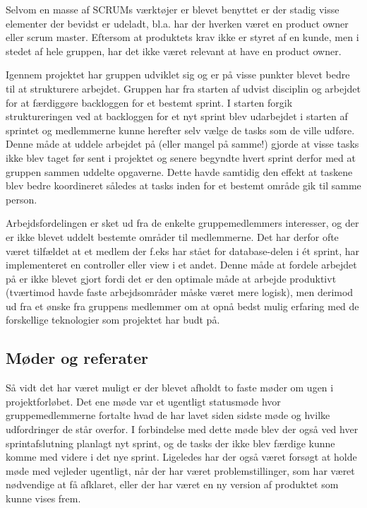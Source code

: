 Selvom en masse af SCRUMs værktøjer er blevet benyttet er der stadig visse elementer der bevidst er udeladt, bl.a. har der hverken været en product owner eller scrum master. Eftersom at produktets krav ikke er styret af en kunde, men i stedet af hele gruppen, har det ikke været relevant at have en product owner.

Igennem projektet har gruppen udviklet sig og er på visse punkter blevet bedre til at strukturere arbejdet. Gruppen har fra starten af udvist disciplin og arbejdet for at færdiggøre backloggen for et bestemt sprint. I starten forgik struktureringen ved at backloggen for et nyt sprint blev udarbejdet i starten af sprintet og medlemmerne kunne herefter selv vælge de tasks som de ville udføre. Denne måde at uddele arbejdet på (eller mangel på samme!) gjorde at visse tasks ikke blev taget før sent i projektet og senere begyndte hvert sprint derfor med at gruppen sammen uddelte opgaverne. Dette havde samtidig den effekt at taskene blev bedre koordineret således at tasks inden for et bestemt område gik til samme person. 

Arbejdsfordelingen er sket ud fra de enkelte gruppemedlemmers interesser, og der er ikke blevet uddelt bestemte områder til medlemmerne. Det har derfor ofte været tilfældet at et medlem der f.eks har stået for database-delen i ét sprint, har implementeret en controller eller view i et andet. Denne måde at fordele arbejdet på er ikke blevet gjort fordi det er den optimale måde at arbejde produktivt (tværtimod havde faste arbejdsområder måske været mere logisk), men derimod ud fra et ønske fra gruppens medlemmer om at opnå bedst mulig erfaring med de forskellige teknologier som projektet har budt på.

\subsection{Møder og referater}
Så vidt det har været muligt er der blevet afholdt to faste møder om ugen i projektforløbet. Det ene møde var et ugentligt statusmøde hvor gruppemedlemmerne fortalte hvad de har lavet siden sidste møde og hvilke udfordringer de står overfor. I forbindelse med dette møde blev der også ved hver sprintafslutning planlagt nyt sprint, og de tasks der ikke blev færdige kunne komme med videre i det nye sprint. Ligeledes har der også været forsøgt at holde møde med vejleder ugentligt, når der har været problemstillinger, som har været nødvendige at få afklaret, eller der har været en ny version af produktet som kunne vises frem.

